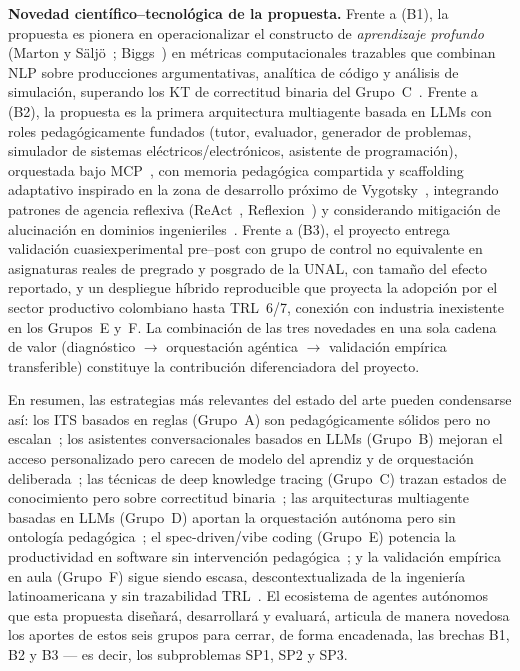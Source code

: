 \textbf{Novedad científico--tecnológica de la propuesta.}
Frente a (B1), la propuesta es pionera en operacionalizar el constructo de \emph{aprendizaje profundo} (Marton y Säljö~\cite{marton1976qualitative}; Biggs~\cite{biggs1999teaching}) en métricas computacionales trazables que combinan NLP sobre producciones argumentativas, analítica de código y análisis de simulación, superando los KT de correctitud binaria del Grupo~C~\cite{tong2025deepkt,fazil2024asist,li2025option,bai2025deckt}. Frente a (B2), la propuesta es la primera arquitectura multiagente basada en LLMs con roles pedagógicamente fundados (tutor, evaluador, generador de problemas, simulador de sistemas eléctricos/electrónicos, asistente de programación), orquestada bajo MCP~\cite{roitman2026guide}, con memoria pedagógica compartida y scaffolding adaptativo inspirado en la zona de desarrollo próximo de Vygotsky~\cite{vygotsky1978mind}, integrando patrones de agencia reflexiva (ReAct~\cite{yao2023react}, Reflexion~\cite{shinn2023reflexion}) y considerando mitigación de alucinación en dominios ingenieriles~\cite{ji2023hallucination,huang2025hallucination}. Frente a (B3), el proyecto entrega validación cuasiexperimental pre--post con grupo de control no equivalente en asignaturas reales de pregrado y posgrado de la UNAL, con tamaño del efecto reportado, y un despliegue híbrido reproducible que proyecta la adopción por el sector productivo colombiano hasta TRL~6/7, conexión con industria inexistente en los Grupos~E y~F. La combinación de las tres novedades en una sola cadena de valor (diagnóstico $\rightarrow$ orquestación agéntica $\rightarrow$ validación empírica transferible) constituye la contribución diferenciadora del proyecto.


En resumen, las estrategias más relevantes del estado del arte pueden condensarse así: los ITS basados en reglas (Grupo~A) son pedagógicamente sólidos pero no escalan~\cite{holmes2022state,zawacki2019systematic,ouyang2021its}; los asistentes conversacionales basados en LLMs (Grupo~B) mejoran el acceso personalizado pero carecen de modelo del aprendiz y de orquestación deliberada~\cite{chan_hu2023perceptions,zhai2024overreliance,escalante2023aifeedback,banihashem2024feedback}; las técnicas de deep knowledge tracing (Grupo~C) trazan estados de conocimiento pero sobre correctitud binaria~\cite{tong2025deepkt,fazil2024asist,li2025option}; las arquitecturas multiagente basadas en LLMs (Grupo~D) aportan la orquestación autónoma pero sin ontología pedagógica~\cite{park2023generative,xi2023rise,wang2024survey,yang2024lamas}; el spec-driven/vibe coding (Grupo~E) potencia la productividad en software sin intervención pedagógica~\cite{piskala2026sdd,feng2026ssde,white_2023vibe}; y la validación empírica en aula (Grupo~F) sigue siendo escasa, descontextualizada de la ingeniería latinoamericana y sin trazabilidad TRL~\cite{hooshyar2024systematic,rivadeneira_2025}. El ecosistema de agentes autónomos que esta propuesta diseñará, desarrollará y evaluará, articula de manera novedosa los aportes de estos seis grupos para cerrar, de forma encadenada, las brechas B1, B2 y B3 — es decir, los subproblemas SP1, SP2 y SP3.

